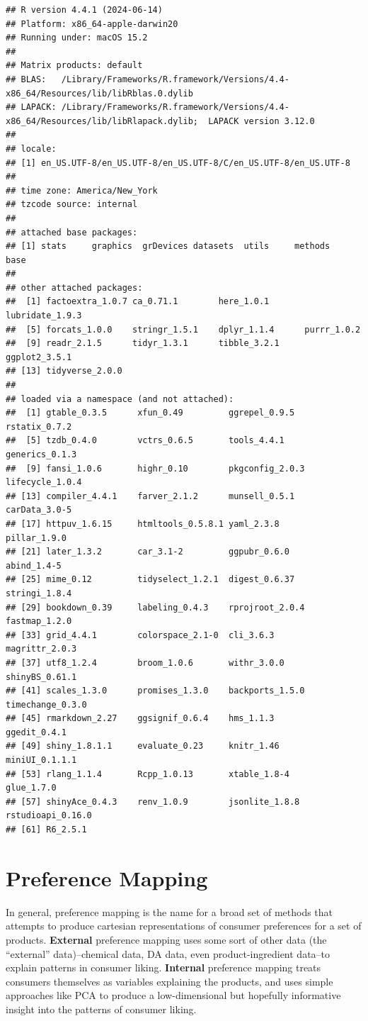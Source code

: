 \documentclass[
]{book}
\begin{document}
\begin{verbatim}
## R version 4.4.1 (2024-06-14)
## Platform: x86_64-apple-darwin20
## Running under: macOS 15.2
## 
## Matrix products: default
## BLAS:   /Library/Frameworks/R.framework/Versions/4.4-x86_64/Resources/lib/libRblas.0.dylib 
## LAPACK: /Library/Frameworks/R.framework/Versions/4.4-x86_64/Resources/lib/libRlapack.dylib;  LAPACK version 3.12.0
## 
## locale:
## [1] en_US.UTF-8/en_US.UTF-8/en_US.UTF-8/C/en_US.UTF-8/en_US.UTF-8
## 
## time zone: America/New_York
## tzcode source: internal
## 
## attached base packages:
## [1] stats     graphics  grDevices datasets  utils     methods   base     
## 
## other attached packages:
##  [1] factoextra_1.0.7 ca_0.71.1        here_1.0.1       lubridate_1.9.3 
##  [5] forcats_1.0.0    stringr_1.5.1    dplyr_1.1.4      purrr_1.0.2     
##  [9] readr_2.1.5      tidyr_1.3.1      tibble_3.2.1     ggplot2_3.5.1   
## [13] tidyverse_2.0.0 
## 
## loaded via a namespace (and not attached):
##  [1] gtable_0.3.5      xfun_0.49         ggrepel_0.9.5     rstatix_0.7.2    
##  [5] tzdb_0.4.0        vctrs_0.6.5       tools_4.4.1       generics_0.1.3   
##  [9] fansi_1.0.6       highr_0.10        pkgconfig_2.0.3   lifecycle_1.0.4  
## [13] compiler_4.4.1    farver_2.1.2      munsell_0.5.1     carData_3.0-5    
## [17] httpuv_1.6.15     htmltools_0.5.8.1 yaml_2.3.8        pillar_1.9.0     
## [21] later_1.3.2       car_3.1-2         ggpubr_0.6.0      abind_1.4-5      
## [25] mime_0.12         tidyselect_1.2.1  digest_0.6.37     stringi_1.8.4    
## [29] bookdown_0.39     labeling_0.4.3    rprojroot_2.0.4   fastmap_1.2.0    
## [33] grid_4.4.1        colorspace_2.1-0  cli_3.6.3         magrittr_2.0.3   
## [37] utf8_1.2.4        broom_1.0.6       withr_3.0.0       shinyBS_0.61.1   
## [41] scales_1.3.0      promises_1.3.0    backports_1.5.0   timechange_0.3.0 
## [45] rmarkdown_2.27    ggsignif_0.6.4    hms_1.1.3         ggedit_0.4.1     
## [49] shiny_1.8.1.1     evaluate_0.23     knitr_1.46        miniUI_0.1.1.1   
## [53] rlang_1.1.4       Rcpp_1.0.13       xtable_1.8-4      glue_1.7.0       
## [57] shinyAce_0.4.3    renv_1.0.9        jsonlite_1.8.8    rstudioapi_0.16.0
## [61] R6_2.5.1
\end{verbatim}

\chapter{Preference Mapping}\label{preference-mapping}

In general, preference mapping is the name for a broad set of methods that attempts to produce cartesian representations of consumer preferences for a set of products. \textbf{External} preference mapping uses some sort of other data (the ``external'' data)--chemical data, DA data, even product-ingredient data--to explain patterns in consumer liking. \textbf{Internal} preference mapping treats consumers themselves as variables explaining the products, and uses simple approaches like PCA to produce a low-dimensional but hopefully informative insight into the patterns of consumer liking.
\end{document}
